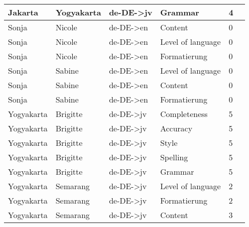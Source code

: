 \begin{center}
\begin{longtable}{|l|l|l|l|l| p{4cm} |}
Jakarta&Yogyakarta&de-DE->jv&Grammar&4&\\ \hline
Sonja&Nicole&de-DE->en&Content&0&\\ \hline
Sonja&Nicole&de-DE->en&Level of language&0&\\ \hline
Sonja&Nicole&de-DE->en&Formatierung&0&\\ \hline
Sonja&Sabine&de-DE->en&Level of language&0& \\ \hline
Sonja&Sabine&de-DE->en&Content&0&\\ \hline
Sonja&Sabine&de-DE->en&Formatierung&0&\\ \hline
Yogyakarta&Brigitte&de-DE->jv&Completeness&5&\\ \hline
Yogyakarta&Brigitte&de-DE->jv&Accuracy&5&\\ \hline
Yogyakarta&Brigitte&de-DE->jv&Style&5&\\ \hline
Yogyakarta&Brigitte&de-DE->jv&Spelling&5&\\ \hline
Yogyakarta&Brigitte&de-DE->jv&Grammar&5&\\ \hline
Yogyakarta&Semarang&de-DE->jv&Level of language&2&\\ \hline
Yogyakarta&Semarang&de-DE->jv&Formatierung&2&\\ \hline
Yogyakarta&Semarang&de-DE->jv&Content&3&\\
\end{longtable}
\end{center}